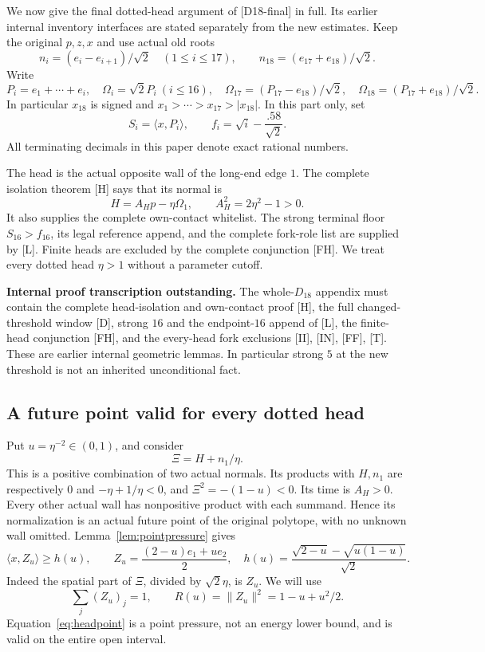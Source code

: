 \documentclass[11pt]{article}
\theoremstyle{definition}
\theoremstyle{remark}
\newcommand{\ip}[2]{\langle #1,#2\rangle}
\newcommand{\norm}[1]{\lVert #1\rVert}
\newcommand{\src}[1]{\textnormal{\textsf{[#1]}}}
\newcommand{\pending}[1]{\par\smallskip\noindent
  {\color{red!65!black}\textbf{Internal proof transcription outstanding.} #1}\par\smallskip}
\begin{document}
We now give the final dotted-head argument of \src{D18-final}
in full. Its earlier internal inventory interfaces are stated
separately from the new estimates.
Keep the original \(p,z,x\) and use actual old roots
\[
 n_i=(e_i-e_{i+1})/\sqrt2\quad(1\leq i\leq17),\qquad
 n_{18}=(e_{17}+e_{18})/\sqrt2.
\]
Write
\[
 P_i=e_1+\cdots+e_i,\quad
 \Omega_i=\sqrt2P_i\ (i\leq16),\quad
 \Omega_{17}=(P_{17}-e_{18})/\sqrt2,\quad
 \Omega_{18}=(P_{17}+e_{18})/\sqrt2.
\]
In particular \(x_{18}\) is signed and
\(x_1>\cdots>x_{17}>|x_{18}|\). In this part only, set
\begin{equation}
\label{eq:d18floors}
 S_i=\ip{x}{P_i},\qquad f_i=\sqrt i-\frac{.58}{\sqrt2}.
\end{equation}
All terminating decimals in this paper denote exact rational numbers.

The head is the actual opposite wall of the long-end edge \(1\).
The complete isolation theorem \src{H} says that its normal is
\[
 H=A_Hp-\eta\Omega_1,\qquad A_H^2=2\eta^2-1>0.
\]
It also supplies the complete own-contact whitelist.
The strong terminal floor \(S_{16}>f_{16}\), its legal reference
append, and the complete fork-role list are supplied by \src{L}.
Finite heads are excluded by the complete conjunction \src{FH}.
We treat every dotted head \(\eta>1\) without a parameter cutoff.

\pending{The whole-\(D_{18}\) appendix must contain the complete head-isolation and
own-contact proof \src{H}, the full changed-threshold window
\src{D}, strong \(16\) and the endpoint-\(16\) append of
\src{L}, the finite-head conjunction \src{FH}, and the
every-head fork exclusions \src{II}, \src{IN}, \src{FF},
\src{T}. These are earlier internal geometric lemmas. In
particular strong \(5\) at the new threshold is not an inherited
unconditional fact.}

\subsection{A future point valid for every dotted head}

Put \(u=\eta^{-2}\in(0,1)\), and consider
\[
 \Xi=H+n_1/\eta.
\]
This is a positive combination of two actual normals.
Its products with \(H,n_1\) are respectively \(0\) and
\(-\eta+1/\eta<0\), and \(\Xi^2=-(1-u)<0\).
Its time is \(A_H>0\). Every other actual wall has nonpositive
product with each summand. Hence its normalization is an actual
future point of the original polytope, with no unknown wall
omitted. Lemma~\ref{lem:pointpressure} gives
\begin{equation}
\label{eq:headpoint}
 \ip{x}{Z_u}\geq h(u),\qquad
 Z_u=\frac{(2-u)e_1+u e_2}{2},\quad
 h(u)=\frac{\sqrt{2-u}-\sqrt{u(1-u)}}{\sqrt2}.
\end{equation}
Indeed the spatial part of \(\Xi\), divided by \(\sqrt2\eta\),
is \(Z_u\). We will use
\[
 \sum_j(Z_u)_j=1,\qquad R(u)=\norm{Z_u}^2=1-u+u^2/2.
\]
Equation~\eqref{eq:headpoint} is a point pressure, not an
energy lower bound, and is valid on the entire open interval.
\end{document}
